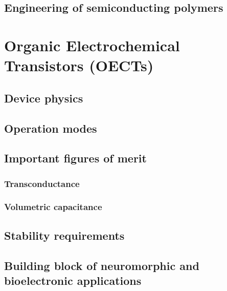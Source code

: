 \subsection{Engineering of semiconducting polymers}


\section{Organic Electrochemical Transistors (OECTs)}
\subsection{Device physics}

\subsection{Operation modes}

\subsection{Important figures of merit}
\subsubsection{Transconductance}
\subsubsection{Volumetric capacitance}

\subsection{Stability requirements}

\subsection{Building block of neuromorphic and bioelectronic applications}